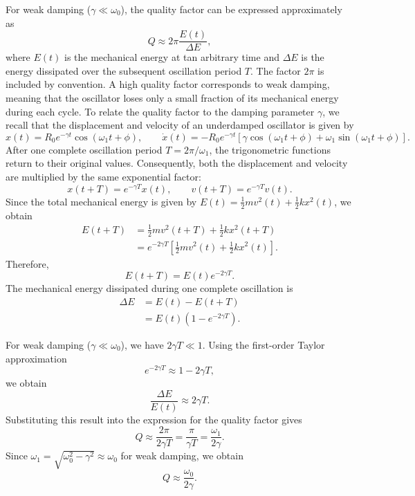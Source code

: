 \documentclass[12pt]{article}
\begin{document}
For weak damping ($\gamma\ll\omega_0$), the quality factor can be expressed approximately as
\begin{equation}
    Q\approx 2\pi\frac{E(t)}{\Delta E},
\end{equation}
where $E(t)$ is the mechanical energy at tan arbitrary time and $\Delta E$ is the energy dissipated over the subsequent oscillation period $T$. The factor $2\pi$ is included by convention. A high quality factor corresponds to weak damping, meaning that the oscillator loses only a small fraction of its mechanical energy during
each cycle. To relate the quality factor to the damping parameter $\gamma$, we recall that the displacement and velocity of an underdamped oscillator is given by
\begin{equation}
    x(t)=R_0 e^{-\gamma t}\cos(\omega_1 t+\phi),
    \qquad
    \dot{x}(t)=-R_0 e^{-\gamma t}\left[\gamma\cos(\omega_1 t+\phi)+\omega_1\sin(\omega_1 t+\phi)\right].
\end{equation}
After one complete oscillation period
$T=2\pi/\omega_1$, the trigonometric functions
return to their original values. Consequently,
both the displacement and velocity are multiplied
by the same exponential factor:
\begin{equation}
    x(t+T)=e^{-\gamma T}x(t),
    \qquad
    v(t+T)=e^{-\gamma T}v(t).
\end{equation}
Since the total mechanical energy is given by $E(t)=\frac12 mv^2(t)+\frac12 kx^2(t)$, we obtain
\begin{align}
    E(t+T)
    &=\frac12 m v^2(t+T)
      +\frac12 k x^2(t+T)\nonumber\\
    &=e^{-2\gamma T}
      \left[\frac12 mv^2(t)
      +\frac12 kx^2(t)\right].
\end{align}
Therefore,
\begin{equation}
    E(t+T)=E(t)e^{-2\gamma T}.
\end{equation}
The mechanical energy dissipated during
one complete oscillation is
\begin{align}
    \Delta E
    &=E(t)-E(t+T)\nonumber\\
    &=E(t)\left(1-e^{-2\gamma T}\right).
\end{align}

For weak damping ($\gamma\ll\omega_0$), we have
$2\gamma T\ll 1$. Using the first-order Taylor
approximation
\begin{equation}
    e^{-2\gamma T}\approx 1-2\gamma T,
\end{equation}
we obtain
\begin{equation}
    \frac{\Delta E}{E(t)}\approx 2\gamma T.
\end{equation}
Substituting this result into the expression for
the quality factor gives
\begin{equation}
    Q\approx\frac{2\pi}{2\gamma T}
    =\frac{\pi}{\gamma T}
    =\frac{\omega_1}{2\gamma}.
\end{equation}
Since $\omega_1=\sqrt{\omega_0^2-\gamma^2}
\approx\omega_0$ for weak damping, we obtain
\begin{equation}
    Q\approx\frac{\omega_0}{2\gamma}.
\end{equation}
\end{document}
